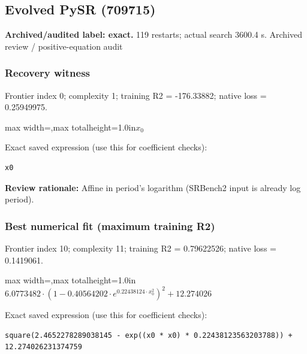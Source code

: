 \documentclass[10pt,letterpaper,landscape]{article}
\begin{document}
\begin{minipage}[t]{0.485\textwidth}
\subsection*{Evolved PySR (709715)}
\textbf{Archived/audited label: exact.} 119 restarts; actual search 3600.4 s.
{\small Archived review / positive-equation audit}
\subsubsection*{Recovery witness}
Frontier index 0; complexity 1; training R2 = -176.33882; native loss = 0.25949975.
\begin{center}\begin{adjustbox}{max width=\linewidth,max totalheight=1.0in}$\displaystyle x_{0}$\end{adjustbox}\end{center}
{\scriptsize Exact saved expression (use this for coefficient checks):}
\begin{lstlisting}
x0
\end{lstlisting}
{\small\textbf{Review rationale:} Affine in period's logarithm (SRBench2 input is already log period).}
\subsubsection*{Best numerical fit (maximum training R2)}
Frontier index 10; complexity 11; training R2 = 0.79622526; native loss = 0.1419061.
\begin{center}\begin{adjustbox}{max width=\linewidth,max totalheight=1.0in}$\displaystyle 6.0773482 \cdot \left(1 - 0.40564202 \cdot e^{0.22438124 \cdot x_{0}^{2}}\right)^{2} + 12.274026$\end{adjustbox}\end{center}
{\scriptsize Exact saved expression (use this for coefficient checks):}
\begin{lstlisting}
square(2.4652278289038145 - exp((x0 * x0) * 0.22438123563203788)) + 12.274026231374759
\end{lstlisting}
\end{minipage}
\clearpage{}\label{newton-10000}
\end{document}
